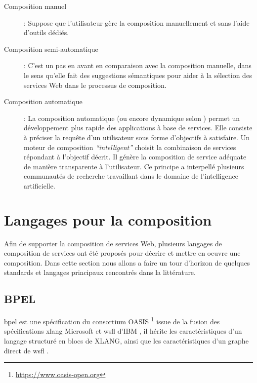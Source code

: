     \renewcommand{\descriptionlabel}[1]{\hspace{0.5cm}\textbullet~\textsf{#1}}
    \begin{description}
    \item[Composition manuel]: Suppose que l'utilisateur gère la
      composition manuellement et sans l'aide d'outils dédiés.

    \item[Composition semi-automatique]: C'est un pas en avant en
      comparaison avec la composition manuelle, dans le sens qu'elle
      fait des suggestions sémantiques pour aider à la sélection des
      services Web dans le processus de composition.

    \item[Composition automatique]: La composition automatique (ou
      encore dynamique selon \cite{fluegge2006challenges}) permet un
      développement plus rapide des applications à base de
      services. Elle consiste à préciser la requête d'un utilisateur
      sous forme d'objectifs à satisfaire. Un moteur de composition
      \textit{``intelligent''} choisit la combinaison de services
      répondant à l'objectif décrit. Il génère la composition de
      service adéquate de manière transparente à l'utilisateur. Ce
      principe a interpellé plusieurs communautés de recherche
      travaillant dans le domaine de l'intelligence artificielle.
      \cite{elie2010}
    \end{description}
    \enddescription

\section{Langages pour la composition}
\label{sec:lang-de-comp}
Afin de supporter la composition de services Web, plusieurs langages
de composition de services ont été proposés pour décrire et mettre en
oeuvre une composition. Dans cette section nous allons a faire un tour
d'horizon de quelques standards et langages principaux rencontrés dans
la littérature.

  \subsection{BPEL}
  \label{sec:bpel}
  \acrshort{bpel} est une spécification du consortium OASIS
  \footnote{\url{https://www.oasis-open.org}} issue de la fusion des
  spécifications \acrshort{xlang} Microsoft et \acrshort{wsfl} d'IBM ,
  il hérite les caractéristiques d'un langage structuré en blocs de
  \textsc{XLANG}, ainsi que les caractéristiques d'un graphe direct de
  \acrshort{wsfl} \cite{driss2011approche}.\medskip

